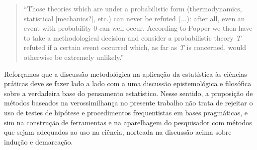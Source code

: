 \begin{quote}
``Those theories which are under a probabilistic form (thermodynamics, statistical [mechanics?], etc.) can never be refuted (...):
after all, even an event with probability 0 can well occur. According to Popper we then have to take a methodological decision
and consider a probabilistic theory {\em T} refuted if a certain event occurred which, as far as {\em T} is concerned, would 
otherwise be extremely unlikely.'' \citep{deFinetti2010}
\end{quote}

Reforçamos que a discussão metodológica na aplicação da estatística às ciências práticas deve se fazer lado a lado
com a uma discussão
epistemológica e filosófica sobre a verdadeira base do pensamento estatístico. Nesse sentido, a proposição de
métodos baseados na verossimilhança no presente trabalho não trata de rejeitar o uso de testes de hipótese 
e procedimentos frequentistas em
bases pragmáticas, e sim na construção de ferramentas e na aparelhagem do pesquisador com métodos que sejam
adequados ao uso na ciência, norteada na discussão acima sobre indução e demarcação.
